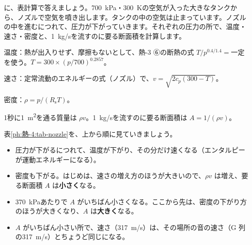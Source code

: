 \leavevmode\label{ph:熱-4:sec5}\bkhatenaref に、表計算で答えましょう。\qty{700}{kPa}・\qty{300}{K}の空気が入った大きなタンクから、ノズルで空気を噴き出します。タンクの中の空気は止まっています。ノズルの中を進むにつれて、圧力が下がっていきます。それぞれの圧力の所で、温度・速さ・密度と、\qty{1}{kg/s}を流すのに要る断面積を計算します。
\begin{enumerate}[label={\bkcircled[bkBlue]{\arabic*}}, leftmargin=2.4\zw, itemsep=2pt, topsep=2pt]
\item 温度：熱が出入りせず、摩擦もないとして、熱-3 ⑥の断熱の式 $T/p^{0.4/1.4}=$一定 を使う。$T=300\times(p/700)^{0.2857}$。
\item 速さ：定常流動のエネルギーの式（ノズル）で、$v=\sqrt{2c_p(300-T)}$。
\item 密度：$\rho=p/(R_{\mathrm s}T)$。
\item 1秒に\qty{1}{m^2}を通る質量は $\rho v$。\qty{1}{kg/s}を流すのに要る断面積は $A=1/(\rho v)$。
\end{enumerate}
\begin{bkcenter}
\label{ph:熱-4:tab-nozzle}
\end{bkcenter}

表\ref{ph:熱-4:tab-nozzle}を、上から順に見ていきましょう。
\begin{itemize}[leftmargin=1.2\zw, itemsep=2pt, topsep=2pt, label={\color{bkTheme}●}]
\item 圧力が下がるにつれて、温度が下がり、その分だけ速くなる（エンタルピーが運動エネルギーになる）。
\item 密度も下がる。はじめは、速さの増え方のほうが大きいので、$\rho v$ は増え、要る断面積 $A$ は\textbf{小さく}なる。
\item \qty{370}{kPa}あたりで $A$ がいちばん小さくなる。ここから先は、密度の下がり方のほうが大きくなり、$A$ は\textbf{大きく}なる。
\item $A$ がいちばん小さい所で、速さ（\qty{317}{m/s}）は、その場所の音の速さ（G 列の\qty{317}{m/s}）とちょうど同じになる。
\end{itemize}

